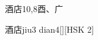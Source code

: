 \begin{entry}{酒店}{10,8}{⾣、⼴}
  \begin{phonetics}{酒店}{jiu3 dian4}[][HSK 2]
  \end{phonetics}
\end{entry}
